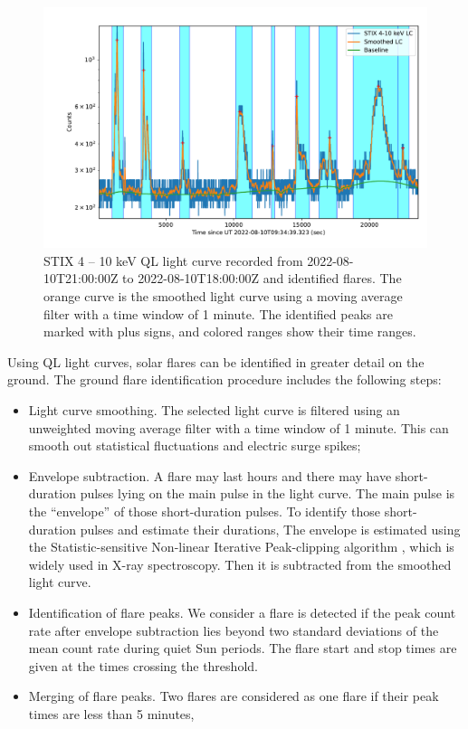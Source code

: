 \documentclass[referee]{aa} %
\begin{document}
\begin{figure}
  \centering
  \includegraphics[width=0.8\linewidth]{figures/flaredet.pdf}
  \caption{STIX 4 -- 10 keV QL light curve recorded from 2022-08-10T21:00:00Z to 2022-08-10T18:00:00Z and 
  identified flares.   The orange curve is the smoothed light curve using a moving average filter with a time window
  of 1 minute.  The identified peaks are marked with plus signs, and colored ranges show their time ranges.
  }
  \label{fig:flare-det}
\end{figure}
Using QL light curves, solar flares can be identified in greater detail on the ground. 
The ground flare identification procedure includes the following steps:
\begin{itemize}
  \item Light curve smoothing. The selected light curve is filtered using an unweighted
  moving average filter with a time window of 1 minute. This can smooth out statistical fluctuations and electric surge spikes;
  \item Envelope subtraction.  
   A flare may last hours and there may have short-duration pulses lying on the main pulse in the light curve.
   The main pulse is the “envelope” of those short-duration pulses.
  To identify those short-duration pulses and estimate their durations, 
  The envelope is estimated using the Statistic-sensitive Non-linear Iterative Peak-clipping algorithm \cite{sinp}, which is widely used in X-ray spectroscopy.
    Then it is subtracted from the smoothed light curve.
  \item Identification of flare peaks. We consider a flare is detected 
 if the peak count rate after envelope subtraction lies beyond two standard deviations 
 of the mean count rate during quiet Sun periods. 
  The flare start and stop times are given at the times crossing the threshold.  
  \item Merging of flare peaks. Two flares are considered as one flare if their peak times are less than 5 minutes,
\end{itemize}
\end{document}
